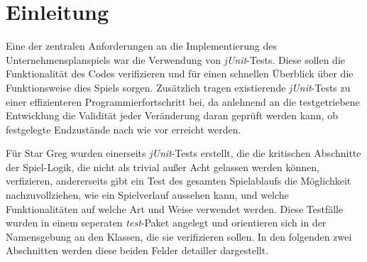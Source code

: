 \section{Einleitung}
\label{sec:junit-einleitung}


\newcommand{\junit}{\textit{jUnit}}

Eine der zentralen Anforderungen an die Implementierung des Unternehmensplanspiels war die Verwendung von \junit-Tests. Diese sollen die Funktionalität des Codes verifizieren und für einen schnellen Überblick über die Funktionsweise dies Spiels sorgen. Zusätzlich tragen existierende \junit-Tests zu einer effizienteren Programmierfortschritt bei, da anlehnend an die testgetriebene Entwicklung die Validität jeder Veränderung daran geprüft werden kann, ob festgelegte Endzustände nach wie vor erreicht werden.

Für Star Greg wurden einerseits \junit-Tests erstellt, die die kritischen Abschnitte der Spiel-Logik, die nicht als trivial außer Acht gelassen werden können, verfizieren, andererseits gibt ein Test des gesamten Spielablaufs die Möglichkeit nachzuvollziehen, wie ein Spielverlauf aussehen kann, und welche Funktionalitäten auf welche Art und Weise verwendet werden. Diese Testfälle wurden in einem seperaten \textit{test}-Paket angelegt und orientieren sich in der Namensgebung an den Klassen, die sie verifizieren sollen. In den folgenden zwei Abschnitten werden diese beiden Felder detailler dargestellt.

\autorende{}